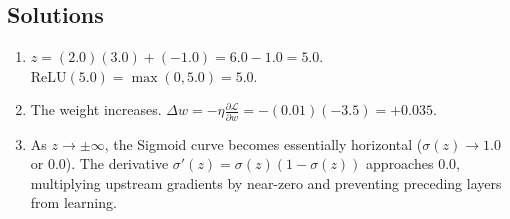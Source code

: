 \subsection*{Solutions}
\begin{enumerate}
    \item $z = (2.0)(3.0) + (-1.0) = 6.0 - 1.0 = 5.0$. $\text{ReLU}(5.0) = \max(0, 5.0) = 5.0$.
    \item The weight increases. $\Delta w = -\eta \frac{\partial \mathcal{L}}{\partial w} = -(0.01)(-3.5) = +0.035$.
    \item As $z \to \pm\infty$, the Sigmoid curve becomes essentially horizontal ($\sigma(z) \to 1.0$ or $0.0$). The derivative $\sigma'(z) = \sigma(z)(1 - \sigma(z))$ approaches $0.0$, multiplying upstream gradients by near-zero and preventing preceding layers from learning.
\end{enumerate}
